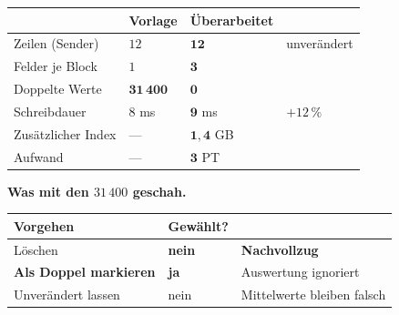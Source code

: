 \begin{merksatz}
\begin{center}
{\small
\renewcommand{\arraystretch}{1.45}
\begin{tabular}{@{}P{2.8cm}P{2.0cm}P{2.2cm}P{2.0cm}@{}}
\toprule
& \textbf{Vorlage} & \textbf{Überarbeitet} & \\
\midrule
Zeilen (Sender) & $12$ & $\mathbf{12}$ & \textcolor{gruen}{unverändert}\\
Felder je Block & $1$ & $\mathbf{3}$ & \\
Doppelte Werte & $\mathbf{31\,400}$ & $\mathbf{0}$ & \\
Schreibdauer & $8$ ms & $\mathbf{9}$ ms & \textcolor{gruen}{$+12\,\%$}\\
Zusätzlicher Index & --- & $\mathbf{1{,}4}$ GB & \\
Aufwand & --- & $\mathbf{3}$ PT & \\
\bottomrule
\end{tabular}}
\end{center}

\begin{center}
\begin{minipage}{0.88\textwidth}
\end{minipage}
\end{center}

\textbf{Was mit den $31\,400$ geschah.}

\begin{center}
\renewcommand{\arraystretch}{1.45}
\begin{tabular}{@{}P{3.0cm}P{2.2cm}P{2.6cm}@{}}
\toprule
\textbf{Vorgehen} & \textbf{Gewählt?} & \\
\midrule
Löschen & \textcolor{akzent}{\textbf{nein}} & \textcolor{akzent}{\textbf{Nachvollzug}}\\
\textbf{Als Doppel markieren} & \textcolor{gruen}{\textbf{ja}} & \textcolor{gruen}{Auswertung ignoriert}\\
Unverändert lassen & \textcolor{akzent}{nein} & \textcolor{akzent}{Mittelwerte bleiben falsch}\\
\bottomrule
\end{tabular}
\end{center}

\begin{center}
\end{center}
\end{merksatz}

